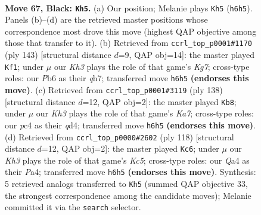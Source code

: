 \documentclass[11pt]{article}
\begin{document}
\clearpage

\begin{figure}[p]\centering
\begin{subfigure}{0.46\textwidth}\centering
\resizebox{\linewidth}{!}{%
\newchessgame
\chessboard[
  setfen={8/8/pp5k/8/q1P5/2K5/8/8 b - - 3 67},
  showmover=false,
  pgfstyle=straightmove, color=movearrow, markmove={h6-h5}
]}
\caption{}
\end{subfigure}\hfill
\begin{subfigure}{0.46\textwidth}\centering
\resizebox{\linewidth}{!}{%
\newchessgame
\chessboard[
  setfen={8/7Q/1K6/p7/8/1Pq5/6k1/8 b - - 3 72},
  showmover=false,
  pgfstyle=straightmove, color=movearrow, markmove={g2-f1}
]}
\caption{}
\end{subfigure}
\\[4pt]
\begin{subfigure}{0.46\textwidth}\centering
\resizebox{\linewidth}{!}{%
\newchessgame
\chessboard[
  setfen={8/K7/8/P7/3q4/Q4p2/8/5k2 w - - 6 70},
  showmover=false,
  pgfstyle=straightmove, color=movearrow, markmove={a7-b8}
]}
\caption{}
\end{subfigure}\hfill
\begin{subfigure}{0.46\textwidth}\centering
\resizebox{\linewidth}{!}{%
\newchessgame
\chessboard[
  setfen={8/5k2/3P4/p1K5/Pp6/8/8/8 w - - 3 60},
  showmover=false,
  pgfstyle=straightmove, color=movearrow, markmove={c5-c6}
]}
\caption{}
\end{subfigure}
\caption{\textbf{Move 67, Black: \texttt{Kh5}.} (a) Our position; Melanie plays \texttt{Kh5} (\texttt{h6h5}). Panels (b)--(d) are the retrieved master positions whose correspondence most drove this move (highest QAP objective among those that transfer to it). (b) Retrieved from \texttt{ccrl\_top\_p0001\#1170} (ply 143) [structural distance $d$=9, QAP obj=14]: the master played \texttt{Kf1}; under $\mu$ our \emph{Kh3} plays the role of that game's \emph{Kg7}; cross-type roles: our \emph{P}b6 as their \emph{q}h7; transferred move \texttt{h6h5} \textbf{(endorses this move)}. (c) Retrieved from \texttt{ccrl\_top\_p0001\#3119} (ply 138) [structural distance $d$=12, QAP obj=2]: the master played \texttt{Kb8}; under $\mu$ our \emph{Kh3} plays the role of that game's \emph{Ka7}; cross-type roles: our \emph{p}c4 as their \emph{q}d4; transferred move \texttt{h6h5} \textbf{(endorses this move)}. (d) Retrieved from \texttt{ccrl\_top\_p0000\#2602} (ply 118) [structural distance $d$=12, QAP obj=2]: the master played \texttt{Kc6}; under $\mu$ our \emph{Kh3} plays the role of that game's \emph{Kc5}; cross-type roles: our \emph{Q}a4 as their \emph{P}a4; transferred move \texttt{h6h5} \textbf{(endorses this move)}. Synthesis: 5 retrieved analogs transferred to \texttt{Kh5} (summed QAP objective 33, the strongest correspondence among the candidate moves); Melanie committed it via the \texttt{search} selector.}
\label{fig:thought-m133}
\end{figure}
\end{document}
